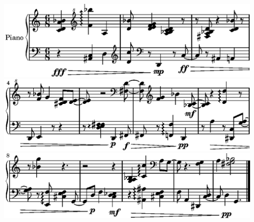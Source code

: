\includegraphics{./bwv345/97/lily-0b97f347-1}%
\ifx\betweenLilyPondSystem \undefined
  \linebreak
\else
  \expandafter{}%
\fi
\includegraphics{./bwv345/97/lily-0b97f347-2}%
\ifx\betweenLilyPondSystem \undefined
  \linebreak
\else
  \expandafter{}%
\fi
\includegraphics{./bwv345/97/lily-0b97f347-3}%
